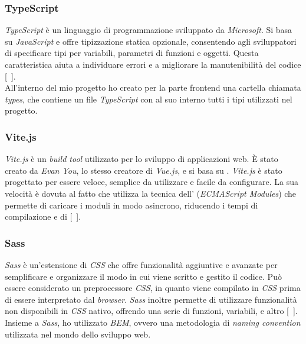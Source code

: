 \subsubsection{TypeScript}\label{subsubsec:typeScript}
\textit{TypeScript} è un linguaggio di programmazione  sviluppato da \textit{Microsoft}. Si basa su \textit{JavaScript} e offre tipizzazione statica opzionale, 
consentendo agli sviluppatori di specificare tipi per variabili, parametri di funzioni e oggetti. Questa caratteristica aiuta a individuare errori e a migliorare 
la manutenibilità del codice [~\cite{site:typescript}].\\
All'interno del mio progetto ho creato per la parte frontend una cartella chiamata \textit{types}, che contiene un file \textit{TypeScript} con al suo interno tutti i tipi utilizzati nel progetto.
\subsubsection{Vite.js}\label{subsubsec:vite}
\textit{Vite.js} è un \textit{build tool} utilizzato per lo sviluppo di applicazioni web. È stato creato da \textit{Evan You}, lo stesso creatore di \textit{Vue.js}, e si basa su .
\textit{Vite.js} è stato progettato per essere veloce, semplice da utilizzare e facile da configurare. La sua velocità è dovuta al fatto che utilizza la tecnica dell' (\textit{ECMAScript Modules})
che permette di caricare i moduli in modo asincrono, riducendo i tempi di compilazione e di  [~\cite{site:vite}].
\subsubsection{Sass}\label{subsubsec:sass}
\textit{Sass} è un'estensione di \textit{CSS} che offre funzionalità aggiuntive e avanzate per semplificare e organizzare il modo in cui viene scritto e gestito il codice.
Può essere considerato un preprocessore \textit{CSS}, in quanto viene compilato in \textit{CSS} prima di essere interpretato dal \textit{browser}. \textit{Sass} inoltre permette di utilizzare funzionalità non disponibili in \textit{CSS} nativo, offrendo una serie di funzioni, variabili,  e altro [~\cite{site:sass}].\\
Insieme a \textit{Sass}, ho utilizzato \textit{BEM}, ovvero una metodologia di \textit{naming convention} utilizzata nel mondo dello sviluppo web.

